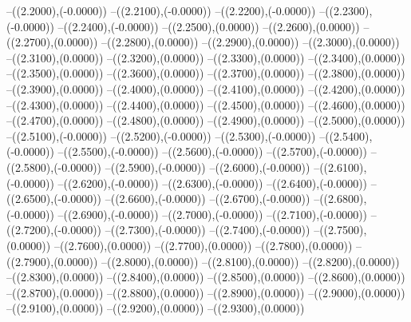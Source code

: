 {	--({\sx*(2.2000)},{\sy*(-0.0000)})
	--({\sx*(2.2100)},{\sy*(-0.0000)})
	--({\sx*(2.2200)},{\sy*(-0.0000)})
	--({\sx*(2.2300)},{\sy*(-0.0000)})
	--({\sx*(2.2400)},{\sy*(-0.0000)})
	--({\sx*(2.2500)},{\sy*(0.0000)})
	--({\sx*(2.2600)},{\sy*(0.0000)})
	--({\sx*(2.2700)},{\sy*(0.0000)})
	--({\sx*(2.2800)},{\sy*(0.0000)})
	--({\sx*(2.2900)},{\sy*(0.0000)})
	--({\sx*(2.3000)},{\sy*(0.0000)})
	--({\sx*(2.3100)},{\sy*(0.0000)})
	--({\sx*(2.3200)},{\sy*(0.0000)})
	--({\sx*(2.3300)},{\sy*(0.0000)})
	--({\sx*(2.3400)},{\sy*(0.0000)})
	--({\sx*(2.3500)},{\sy*(0.0000)})
	--({\sx*(2.3600)},{\sy*(0.0000)})
	--({\sx*(2.3700)},{\sy*(0.0000)})
	--({\sx*(2.3800)},{\sy*(0.0000)})
	--({\sx*(2.3900)},{\sy*(0.0000)})
	--({\sx*(2.4000)},{\sy*(0.0000)})
	--({\sx*(2.4100)},{\sy*(0.0000)})
	--({\sx*(2.4200)},{\sy*(0.0000)})
	--({\sx*(2.4300)},{\sy*(0.0000)})
	--({\sx*(2.4400)},{\sy*(0.0000)})
	--({\sx*(2.4500)},{\sy*(0.0000)})
	--({\sx*(2.4600)},{\sy*(0.0000)})
	--({\sx*(2.4700)},{\sy*(0.0000)})
	--({\sx*(2.4800)},{\sy*(0.0000)})
	--({\sx*(2.4900)},{\sy*(0.0000)})
	--({\sx*(2.5000)},{\sy*(0.0000)})
	--({\sx*(2.5100)},{\sy*(-0.0000)})
	--({\sx*(2.5200)},{\sy*(-0.0000)})
	--({\sx*(2.5300)},{\sy*(-0.0000)})
	--({\sx*(2.5400)},{\sy*(-0.0000)})
	--({\sx*(2.5500)},{\sy*(-0.0000)})
	--({\sx*(2.5600)},{\sy*(-0.0000)})
	--({\sx*(2.5700)},{\sy*(-0.0000)})
	--({\sx*(2.5800)},{\sy*(-0.0000)})
	--({\sx*(2.5900)},{\sy*(-0.0000)})
	--({\sx*(2.6000)},{\sy*(-0.0000)})
	--({\sx*(2.6100)},{\sy*(-0.0000)})
	--({\sx*(2.6200)},{\sy*(-0.0000)})
	--({\sx*(2.6300)},{\sy*(-0.0000)})
	--({\sx*(2.6400)},{\sy*(-0.0000)})
	--({\sx*(2.6500)},{\sy*(-0.0000)})
	--({\sx*(2.6600)},{\sy*(-0.0000)})
	--({\sx*(2.6700)},{\sy*(-0.0000)})
	--({\sx*(2.6800)},{\sy*(-0.0000)})
	--({\sx*(2.6900)},{\sy*(-0.0000)})
	--({\sx*(2.7000)},{\sy*(-0.0000)})
	--({\sx*(2.7100)},{\sy*(-0.0000)})
	--({\sx*(2.7200)},{\sy*(-0.0000)})
	--({\sx*(2.7300)},{\sy*(-0.0000)})
	--({\sx*(2.7400)},{\sy*(-0.0000)})
	--({\sx*(2.7500)},{\sy*(0.0000)})
	--({\sx*(2.7600)},{\sy*(0.0000)})
	--({\sx*(2.7700)},{\sy*(0.0000)})
	--({\sx*(2.7800)},{\sy*(0.0000)})
	--({\sx*(2.7900)},{\sy*(0.0000)})
	--({\sx*(2.8000)},{\sy*(0.0000)})
	--({\sx*(2.8100)},{\sy*(0.0000)})
	--({\sx*(2.8200)},{\sy*(0.0000)})
	--({\sx*(2.8300)},{\sy*(0.0000)})
	--({\sx*(2.8400)},{\sy*(0.0000)})
	--({\sx*(2.8500)},{\sy*(0.0000)})
	--({\sx*(2.8600)},{\sy*(0.0000)})
	--({\sx*(2.8700)},{\sy*(0.0000)})
	--({\sx*(2.8800)},{\sy*(0.0000)})
	--({\sx*(2.8900)},{\sy*(0.0000)})
	--({\sx*(2.9000)},{\sy*(0.0000)})
	--({\sx*(2.9100)},{\sy*(0.0000)})
	--({\sx*(2.9200)},{\sy*(0.0000)})
	--({\sx*(2.9300)},{\sy*(0.0000)})
}
